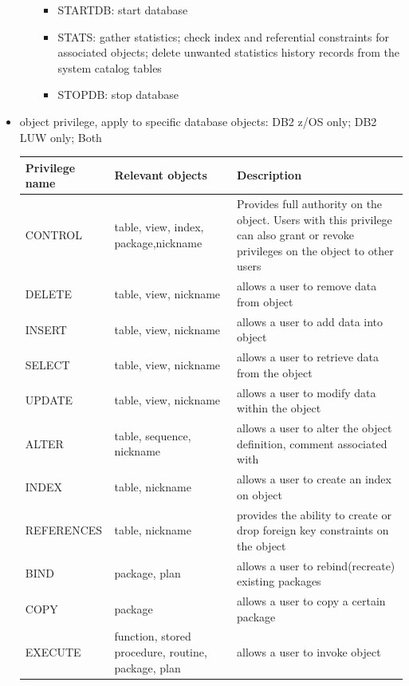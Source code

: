 \documentclass{article}
\begin{document}
\begin{itemize}
\begin{itemize}
\begin{itemize}
\item STARTDB: start database
\item STATS: gather statistics; check index and referential constraints for associated objects;
delete unwanted statistics history records from the system catalog tables
\item STOPDB: stop database
\end{itemize}
\end{itemize}
\item object privilege, apply to specific database objects:
{\color{red} DB2 z/OS only};
{\color{green} DB2 LUW only};
Both
\begin{center}
\begin{longtable}{l |p{5cm}| p{7cm}}
\hline
Privilege name & Relevant objects & Description \\
\hline
CONTROL & {\color{green}table}, {\color{green}view}, {\color{green}index}, {\color{green}package},{\color{green}nickname} & Provides full authority on the object. Users with this privilege can also grant 
or revoke privileges on the object to other users\\\hline
DELETE  & table, view, {\color{green}nickname} & allows a user to remove data from object\\\hline
INSERT  & table, view, {\color{green}nickname} & allows a user to add data into object\\\hline
SELECT  & table, view, {\color{green}nickname} & allows a user to retrieve data from the object\\\hline
UPDATE  & table, view, {\color{green}nickname} & allows a user to modify data within the object\\\hline
ALTER   & table, sequence, {\color{green}nickname} & allows a user to alter the object definition, comment associated with\\\hline
INDEX   & table, {\color{green}nickname} & allows a user to create an index on object\\\hline
REFERENCES & table, {\color{green}nickname} & provides the ability to create or drop foreign key constraints on the object\\\hline
BIND & package, {\color{red}plan} & allows a user to rebind(recreate) existing packages\\\hline
{\color{red}COPY} & package & {\color{red}allows a user to copy a certain package} \\\hline
EXECUTE & {\color{red}function}, {\color{red}stored procedure}, {\color{green}routine}, package, {\color{red}plan} & allows a user to invoke object\\\hline

\end{longtable}
\end{center}
\end{itemize}
\end{document}
